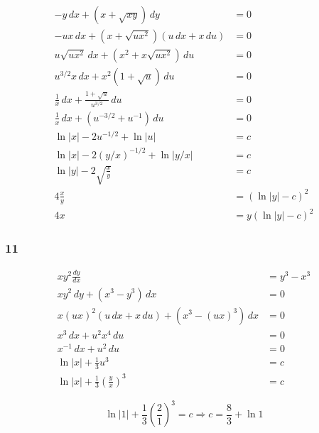 \documentclass{article}
\begin{document}
\begin{align*}
  -y \,dx + (x + \sqrt{x y}) \,dy                        & = 0                 \\
  -u x \,dx + (x + \sqrt{u x^2}) (u \,dx + x \,du)       & = 0                 \\
  u \sqrt{u x^2} \,dx + (x^2 + x \sqrt{u x^2}) \,du      & = 0                 \\
  u^{3 / 2} x \,dx + x^2 (1 + \sqrt{u}) \,du             & = 0                 \\
  \frac{1}{x} \,dx + \frac{1 + \sqrt{u}}{u^{3 / 2}} \,du & = 0                 \\
  \frac{1}{x} \,dx + (u^{-3 / 2} + u^{-1}) \,du          & = 0                 \\
  \ln |x| - 2 u^{-1 / 2} + \ln |u|                       & = c                 \\
  \ln |x| - 2 (y / x)^{-1 / 2} + \ln |y / x|             & = c                 \\
  \ln |y| - 2 \sqrt{\frac{x}{y}}                         & = c                 \\
  4 \frac{x}{y}                                          & = (\ln |y| - c)^2   \\
  4 x                                                    & = y (\ln |y| - c)^2
\end{align*}

\subsubsection{11}

\begin{align*}
  x y^2 \frac{dy}{dx}                                & = y^3 - x^3 \\
  x y^2 \,dy + (x^3 - y^3) \,dx                      & = 0         \\
  x (u x)^2 (u \,dx + x \,du) + (x^3 - (u x)^3) \,dx & = 0         \\
  x^3 \,dx + u^2 x^4 \,du                            & = 0         \\
  x^{-1} \,dx + u^2 \,du                             & = 0         \\
  \ln |x| + \frac{1}{3} u^3                          & = c         \\
  \ln |x| + \frac{1}{3} \left( \frac{y}{x} \right)^3 & = c
\end{align*}

\[\ln |1| + \frac{1}{3} \left( \frac{2}{1} \right)^3 = c \Rightarrow c = \frac{8}{3} + \ln 1\]
\end{document}
